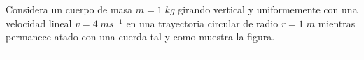 \documentclass[a4paper,addpoints, 12pt]{exam}
\newcommand*\chem[1]{\ensuremath{\mathrm{#1}}}
\newcommand{\halmos}{\vspace*{-6mm}
	
					\begin{flushright}
						\rule{1mm}{2.5mm} 
					\end{flushright}
					\vspace*{-4mm}
						
					  }
\renewcommand{\qed}{\halmos}
\begin{document}
\begin{questions}
%



	\vspace{-3ex}
	
\begin{minipage}{.7\textwidth}
	
	\question Considera un cuerpo de masa $m=1\;kg$ girando vertical y uniformemente con una velocidad lineal $v=4\;ms^{-1}$ en una trayectoria circular de radio $r=1\;m$ mientras permanece atado con una cuerda tal y como muestra la figura. 
	\end{minipage}\hfill
	\begin{minipage}{.35\textwidth}
	\vspace*{3ex}
	
		{\centering
		\def\svgwidth{.6\linewidth}
		
		\par	
		}
		
	\end{minipage}
	\vspace{-4.7ex}
	
	\qed



\end{questions}
\end{document}

